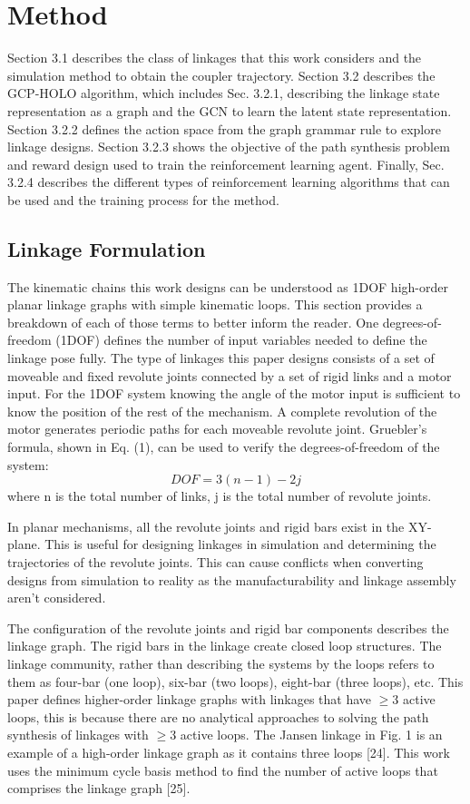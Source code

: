 \section{Method}
Section 3.1 describes the class of linkages that this work considers and the simulation method to obtain the coupler trajectory. Section 3.2 describes the GCP-HOLO algorithm, which includes Sec. 3.2.1, describing the linkage state representation as a graph and the GCN to learn the latent state representation. Section 3.2.2 defines the action space from the graph grammar rule to explore linkage designs. Section 3.2.3 shows the objective of the path synthesis problem and reward design used to train the reinforcement learning agent. Finally, Sec. 3.2.4 describes the different types of reinforcement learning algorithms that can be used and the training process for the method.

\subsection{Linkage Formulation}
The kinematic chains this work designs can be understood as 1DOF high-order planar linkage graphs with simple kinematic loops. This section provides a breakdown of each of those terms to better inform the reader. One degrees-of-freedom (1DOF) defines the number of input variables needed to define the linkage pose fully. The type of linkages this paper designs consists of a set of moveable and fixed revolute joints connected by a set of rigid links and a motor input. For the 1DOF system knowing the angle of the motor input is sufficient to know the position of the rest of the mechanism. A complete revolution of the motor generates periodic paths for each moveable revolute joint. Gruebler’s formula, shown in Eq. (1), can be used to verify the degrees-of-freedom of the system:
\begin{equation}
    DOF = 3(n-1)-2j
\end{equation}
where n is the total number of links, j is the total number of revolute joints.

In planar mechanisms, all the revolute joints and rigid bars exist in the XY-plane. This is useful for designing linkages in simulation and determining the trajectories of the revolute joints. This can cause conflicts when converting designs from simulation to reality as the manufacturability and linkage assembly aren’t considered.

The configuration of the revolute joints and rigid bar components describes the linkage graph. The rigid bars in the linkage create closed loop structures. The linkage community, rather than describing the systems by the loops refers to them as four-bar (one loop), six-bar (two loops), eight-bar (three loops), etc. This paper defines higher-order linkage graphs with linkages that have $\geq$3 active loops, this is because there are no analytical approaches to solving the path synthesis of linkages with $\geq$3 active loops. The Jansen linkage in Fig. 1 is an example of a high-order linkage graph as it contains three loops [24]. This work uses the minimum cycle basis method to find the number of active loops that comprises the linkage graph [25].

